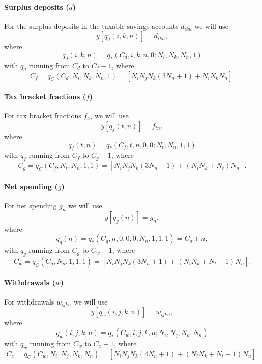 \documentclass{report}[fleqn,12pt]
\begin{document}
\paragraph*{Surplus deposits (\boldmath$d$)}
For the surplus deposits in the taxable savings accounts $d_{ikn}$ we will use
\begin{equation}
	y[q_d(i, k, n)] = d_{ikn},
\end{equation}
where
\begin{equation}
	q_d(i, k, n) = q_*(C_d, i, k, n, 0; N_i, N_k, N_n, 1)
\end{equation}
with $q_d$ running from $C_d$ to $C_f - 1$, where
\[
	C_f = q_C(C_d, N_i, N_k, N_n, 1) = [N_iN_jN_k(3N_n+1) + N_iN_kN_n].
\]

\paragraph*{Tax bracket fractions (\boldmath$f$)}
For tax bracket fractions $f_{t n}$ we will use
\begin{equation}
	y[q_f(t, n)] = f_{t n},
\end{equation}
where
\begin{equation}
	q_f(t, n) = q_*(C_f, t, n, 0, 0; N_t, N_n, 1, 1)
\end{equation}
with $q_f$ running from $C_f$ to $C_g - 1$, where
\[
	C_g = q_C(C_f, N_t, N_n, 1, 1) = [N_iN_jN_k(3N_n+1) + (N_iN_k + N_t) N_n].
\]

\paragraph*{Net spending (\boldmath$g$)}
For net spending $g_{n}$ we will use
\begin{equation}
	y[q_g(n)] = g_{n},
\end{equation}
where
\begin{equation}
	q_g(n) = q_*(C_g, n, 0, 0, 0; N_n, 1, 1, 1) = C_g + n,
\end{equation}
with $q_g$ running from $C_g$ to $C_w - 1$, where
\[
	C_w = q_C(C_g, N_n, 1, 1, 1) = [N_iN_jN_k(3N_n+1) + (N_iN_k + N_t + 1) N_n].
\]

\paragraph*{Withdrawals (\boldmath$w$)}
For withdrawals $w_{ijkn}$ we will use
\begin{equation}
	y[q_w(i, j, k, n)] = w_{i j k n},
\end{equation}
where
\begin{equation}
	q_w(i, j, k, n) = q_*(C_w, i, j, k, n; N_i, N_j, N_k, N_n)
\end{equation}
with $q_w$ running from $C_w$ to $C_x - 1$, where
\[
	C_x = q_C(C_w, N_i, N_j, N_k, N_n) = [N_iN_jN_k(4N_n + 1) + (N_iN_k + N_t + 1) N_n].
\]
\end{document}
